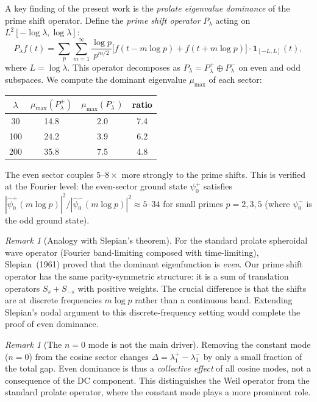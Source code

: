 \documentclass[12pt,a4paper]{article}
\theoremstyle{definition}
\theoremstyle{remark}
\newtheorem{remark}[theorem]{Remark}
\begin{document}
A key finding of the present work is the \emph{prolate eigenvalue dominance} of the prime shift operator. Define the \emph{prime shift operator} $P_\lambda$ acting on $L^2[-\log\lambda, \log\lambda]$:
\[ P_\lambda f(t) = \sum_p \sum_{m=1}^\infty \frac{\log p}{p^{m/2}} \bigl[f(t - m\log p) + f(t + m\log p)\bigr] \cdot \mathbf{1}_{[-L,L]}(t), \]
where $L = \log\lambda$. This operator decomposes as $P_\lambda = P_\lambda^+ \oplus P_\lambda^-$ on even and odd subspaces. We compute the dominant eigenvalue $\mu_{\max}$ of each sector:

\begin{center}
\begin{tabular}{cccc}
$\lambda$ & $\mu_{\max}(P_\lambda^+)$ & $\mu_{\max}(P_\lambda^-)$ & ratio \\
\hline
30  & 14.8 &  2.0 & 7.4 \\
100 & 24.2 &  3.9 & 6.2 \\
200 & 35.8 &  7.5 & 4.8
\end{tabular}
\end{center}

The even sector couples $5$--$8\times$ more strongly to the prime shifts. This is verified at the Fourier level: the even-sector ground state $\psi_0^+$ satisfies $|\hat\psi_0^+(m\log p)|^2 / |\hat\psi_0^-(m\log p)|^2 \approx 5$--$34$ for small primes $p = 2,3,5$ (where $\psi_0^-$ is the odd ground state).

\begin{remark}[Analogy with Slepian's theorem]
For the standard prolate spheroidal wave operator (Fourier band-limiting composed with time-limiting), Slepian~(1961) proved that the dominant eigenfunction is \emph{even}. Our prime shift operator has the same parity-symmetric structure: it is a sum of translation operators $S_s + S_{-s}$ with positive weights. The crucial difference is that the shifts are at discrete frequencies $m\log p$ rather than a continuous band. Extending Slepian's nodal argument to this discrete-frequency setting would complete the proof of even dominance.
\end{remark}

\begin{remark}[The $n=0$ mode is not the main driver]
Removing the constant mode ($n=0$) from the cosine sector changes $\Delta = \lambda_1^+ - \lambda_1^-$ by only a small fraction of the total gap. Even dominance is thus a \emph{collective effect} of all cosine modes, not a consequence of the DC component. This distinguishes the Weil operator from the standard prolate operator, where the constant mode plays a more prominent role.
\end{remark}
\end{document}
